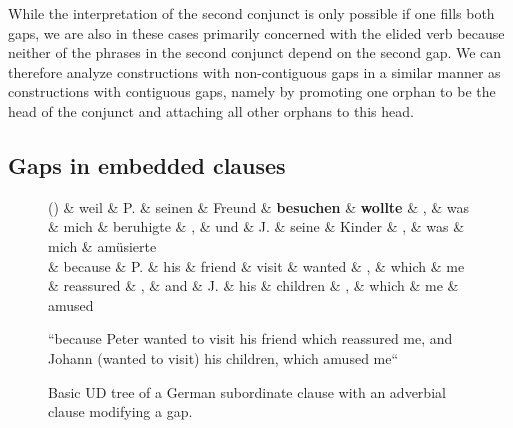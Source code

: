\documentclass[11pt]{article}
\newcounter{excounter}
\begin{document}
While the interpretation of the second conjunct is only possible if one fills both gaps, 
we are also in these cases primarily concerned with the elided verb because neither 
of the phrases in the second conjunct depend on the second gap. We can therefore 
analyze constructions with non-contiguous gaps in a similar manner as constructions 
with contiguous gaps, namely by promoting one orphan to be the head of the conjunct 
and attaching all other orphans to this head. 

\subsection{Gaps in embedded clauses}

\begin{figure*}
  \label{ex:de-gap-1}
  \footnotesize
  \begin{dependency}[edge unit distance=2.5ex]
    \begin{deptext}[column sep=-0.05cm]
      (\theexcounter) \& weil \& P. \& seinen \& Freund \& \textbf{besuchen} \& \textbf{wollte} \& , \& was \& mich \& beruhigte \& , \& und \& J. \& seine \& Kinder \& , \& was \& mich \& am\"usierte \\
      \& because \& P. \& his \& friend \& visit \& wanted \& , \& which \& me \& reassured \& , \& and \& J. \& his \& children \& , \& which \& me \& amused \\
    \end{deptext}
  \end{dependency}
  ``because Peter wanted to visit his friend which reassured me, and Johann (wanted to visit) his children, which amused me`` \\ \null \hfill \cite{Wyngaerd2007}
  \caption{Basic UD tree of a German subordinate clause with an adverbial clause modifying a gap.}
  \label{fig:ger-advcl}
\end{figure*}
\end{document}
